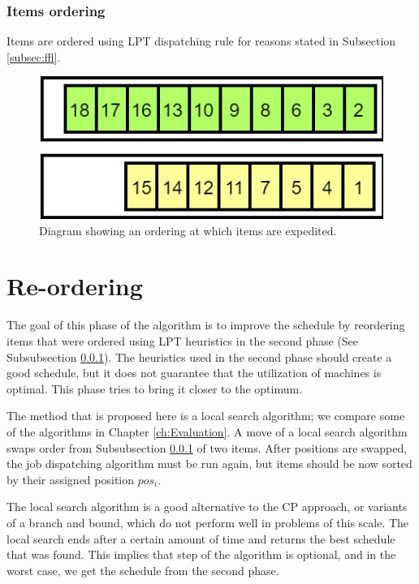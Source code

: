 \documentclass{ctuthesis}
\begin{document}
\subsubsection{Items ordering}
\label{subsubsec:itemsordering}

Items are ordered using LPT dispatching rule for reasons stated in Subsection \ref{subsec:ffl}.


\begin{figure}[h]
\includegraphics[width=0.8\linewidth]{order.jpg}
\caption{Diagram showing an ordering at which items are expedited.}
\label{order}
\end{figure}

\section{Re-ordering}

The goal of this phase of the algorithm is to improve the schedule by reordering items that were ordered using LPT heuristics in the second phase (See Subsubsection \ref{subsubsec:itemsordering}). The heuristics used in the second phase should create a good schedule, but it does not guarantee that the utilization of machines is optimal. This phase tries to bring it closer to the optimum.

The method that is proposed here is a local search algorithm; we compare some of the algorithms in Chapter \ref{ch:Evaluation}. A move of a local search algorithm swaps order from Subsubsection \ref{subsubsec:itemsordering} of two items. After positions are swapped, the job dispatching algorithm must be run again, but items should be now sorted by their assigned position $pos_i$.

The local search algorithm is a good alternative to the CP approach, or variants of a branch and bound, which do not perform well in problems of this scale. The local search ends after a certain amount of time and returns the best schedule that was found. This implies that step of the algorithm is optional, and in the worst case, we get the schedule from the second phase.
\end{document}
